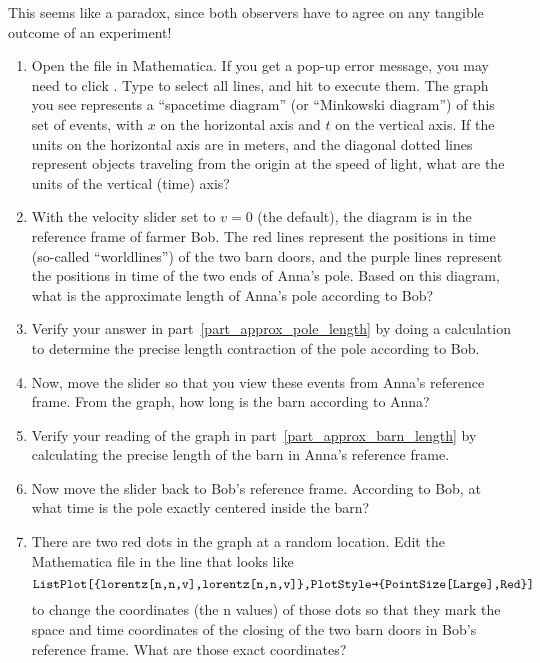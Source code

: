 This seems like a paradox, since both observers have to agree on any tangible outcome of an experiment!

\begin{enumerate}
\item Open the file  in Mathematica. If you get a pop-up error message, you may need to click . Type  to select all lines, and hit  to execute them. The graph you see represents a ``spacetime diagram'' (or ``Minkowski diagram'') of this set of events, with $x$ on the horizontal axis and $t$ on the vertical axis. If the units on the horizontal axis are in meters, and the diagonal dotted lines represent objects traveling from the origin at the speed of light, what are the units of the vertical (time) axis?
\answerspace{0.6in}

\item With the velocity slider set to $v = 0$ (the default), the diagram is in the reference frame of farmer Bob. The red lines represent the positions in time (so-called ``worldlines'') of the two barn doors, and the purple lines represent the positions in time of the two ends of Anna's pole. Based on this diagram, what is the approximate length of Anna's pole according to Bob?  \label{part_approx_pole_length}
\answerspace{0.6in}

\item Verify your answer in part~\ref{part_approx_pole_length} by doing a calculation to determine the precise length contraction of the pole according to Bob.
\answerspace{0.6in}

\item Now, move the slider so that you view these events from Anna's reference frame.
From the graph, how long is the barn according to Anna? \label{part_approx_barn_length}
\answerspace{0.6in}

\item Verify your reading of the graph in part~\ref{part_approx_barn_length} by calculating the precise length of the barn in Anna's reference frame.
\answerspace{0.6in}

\item Now move the slider back to Bob's reference frame. According to Bob, at what time is the pole exactly centered inside the barn?
\answerspace{0.6in}

\item There are two red dots in the graph at a random location. Edit the Mathematica file in the line that looks like
$$\verb!ListPlot[{lorentz[n,n,v],lorentz[n,n,v]},PlotStyle→{PointSize[Large],Red}]!$$
to change the coordinates (the n values) of those dots so that they mark the space and time coordinates of the closing of the two barn doors in Bob's reference frame. What are those exact coordinates?
\answerspace{0.8in}


\end{enumerate}
